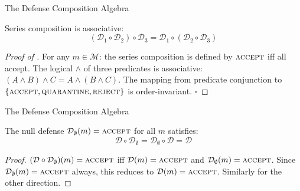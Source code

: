 \documentclass[
  ignorenonframetext,
]{beamer}
\providecommand{\cref}[1]{\texttt{\detokenize{#1}}}
\begin{document}
\begin{frame}[allowframebreaks]{The Defense Composition Algebra}
\begin{lemma}
\label{lem:comp-assoc}
Series composition is associative:
\begin{equation}
\label{eq:comp-assoc}
(\mathcal{D}_1 \circ \mathcal{D}_2) \circ \mathcal{D}_3 = \mathcal{D}_1 \circ (\mathcal{D}_2 \circ \mathcal{D}_3)
\end{equation}
\end{lemma}

\begin{proof}[Proof of \cref{lem:comp-assoc}]
For any $m \in \mathcal{M}$: the series composition is defined by $\textsc{accept}$ iff all accept. The logical $\land$ of three predicates is associative: $(A \land B) \land C = A \land (B \land C)$. The mapping from predicate conjunction to $\{\textsc{accept}, \textsc{quarantine}, \textsc{reject}\}$ is order-invariant. $\square$
\end{proof}

\end{frame}

\begin{frame}[allowframebreaks]{The Defense Composition Algebra}
\begin{lemma}
\label{lem:null-identity}
The null defense $\mathcal{D}_\emptyset(m) = \textsc{accept}$ for all $m$ satisfies:
\begin{equation}
\label{eq:null-identity}
\mathcal{D} \circ \mathcal{D}_\emptyset = \mathcal{D}_\emptyset \circ \mathcal{D} = \mathcal{D}
\end{equation}
\end{lemma}

\begin{proof}
$(\mathcal{D} \circ \mathcal{D}_\emptyset)(m) = \textsc{accept}$ iff $\mathcal{D}(m) = \textsc{accept}$ and $\mathcal{D}_\emptyset(m) = \textsc{accept}$. Since $\mathcal{D}_\emptyset(m) = \textsc{accept}$ always, this reduces to $\mathcal{D}(m) = \textsc{accept}$. Similarly for the other direction.
\end{proof}

\end{frame}
\end{document}

